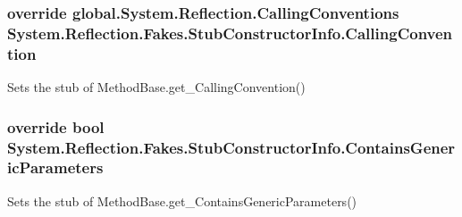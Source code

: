 \hypertarget{class_system_1_1_reflection_1_1_fakes_1_1_stub_constructor_info_ab8d9b3ff638980128829a3faba5c7ea2}{
\subsubsection[{Calling\-Convention}]{\setlength{\rightskip}{0pt plus 5cm}override global.\-System.\-Reflection.\-Calling\-Conventions System.\-Reflection.\-Fakes.\-Stub\-Constructor\-Info.\-Calling\-Convention\hspace{0.3cm}{\ttfamily [get]}}}\label{class_system_1_1_reflection_1_1_fakes_1_1_stub_constructor_info_ab8d9b3ff638980128829a3faba5c7ea2}


Sets the stub of Method\-Base.\-get\-\_\-\-Calling\-Convention()

\hypertarget{class_system_1_1_reflection_1_1_fakes_1_1_stub_constructor_info_aa5ac80bb68775b2de3b5397e659f1918}{
\subsubsection[{Contains\-Generic\-Parameters}]{\setlength{\rightskip}{0pt plus 5cm}override bool System.\-Reflection.\-Fakes.\-Stub\-Constructor\-Info.\-Contains\-Generic\-Parameters\hspace{0.3cm}{\ttfamily [get]}}}\label{class_system_1_1_reflection_1_1_fakes_1_1_stub_constructor_info_aa5ac80bb68775b2de3b5397e659f1918}


Sets the stub of Method\-Base.\-get\-\_\-\-Contains\-Generic\-Parameters()

